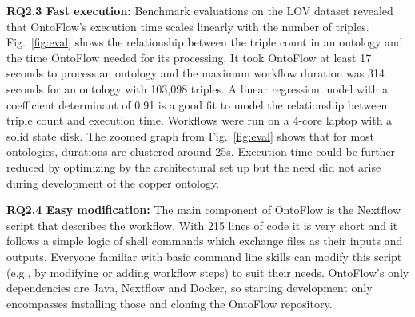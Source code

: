 \documentclass[runningheads]{llncs}
\begin{document}
\noindent\textbf{RQ2.3 Fast execution:} Benchmark evaluations on the LOV dataset revealed that OntoFlow's execution time scales linearly with the number of triples. Fig.~\ref{fig:eval} shows the relationship between the triple count in an ontology and the time OntoFlow needed for its processing. It took OntoFlow at least 17 seconds to process an ontology and the maximum workflow duration was 314 seconds for an ontology with 103,098 triples. A linear regression model with a coefficient determinant of 0.91 is a good fit to model the relationship between triple count and execution time. Workflows were run on a 4-core laptop with a solid state disk. The zoomed graph from Fig.~\ref{fig:eval} shows that for most ontologies, durations are clustered around 25s. Execution time could be further reduced by optimizing by the architectural set up but the need did not arise during development of the copper ontology.

\noindent\textbf{RQ2.4 Easy modification:} The main component of OntoFlow is the Nextflow script that describes the workflow. With 215 lines of code it is very short and it follows a simple logic of shell commands which exchange files as their inputs and outputs. Everyone familiar with basic command line skills can modify this script (e.g., by modifying or adding workflow steps) to suit their needs. OntoFlow's only dependencies are Java, Nextflow and Docker, so starting development only encompasses installing those and cloning the OntoFlow repository.
\end{document}
